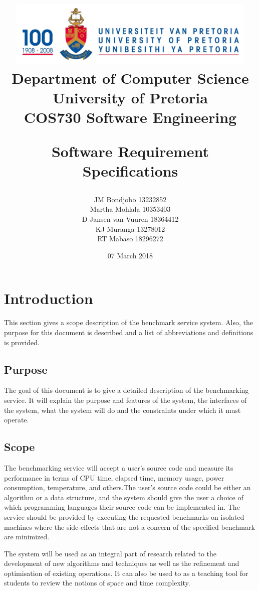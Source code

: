 \documentclass[a4paper,12pt]{article}
\title{\includegraphics[width=12cm]{Eeufeeslogo.jpg} \\
       Department of Computer Science \\
       University of Pretoria \\
       \vspace{0.5cm}
       COS730 Software Engineering \\
       \vspace{0.5cm}
       \begin{large} \textbf{Software Requirement Specifications}\end{large}}
\date{07 March 2018}
\author{	JM Bondjobo		13232852 \\
		Martha Mohlala		10353403\\
		D Jansen van Vuuren	18364412\\
		 KJ Muranga         13278012        \\
		 RT Mabaso          18296272
}
\begin{document}
\maketitle
\thispagestyle{empty}
\clearpage

\newpage
{}
\thispagestyle{empty}
\tableofcontents
\clearpage

\newpage
{}

\section {Introduction}
This section gives a scope description of the benchmark service system. Also, the purpose for this document is described and a list of abbreviations and definitions is provided.
\subsection{Purpose}
The goal of this document is to give a detailed description of the  benchmarking service. It will explain the purpose and features of the system, the interfaces of the system, what the system will do and the constraints under which it must operate.


\subsection{Scope}
The benchmarking service will accept a user's source code and measure its performance in terms of CPU time, elapsed time, memory usage, power consumption, temperature, and others.The user's source code could be either an algorithm or a data structure, and the system should give the user a choice of which programming languages their source code can be implemented in. The service should be provided by executing the requested benchmarks on isolated machines where the side-effects that are not a concern of the specified benchmark are minimized.

The system will be used as an integral part of research related to the development of new algorithms and techniques as well as the refinement and optimisation of existing operations. It can also be used to as a teaching tool for students to review the notions of space and time complexity.
\end{document}
